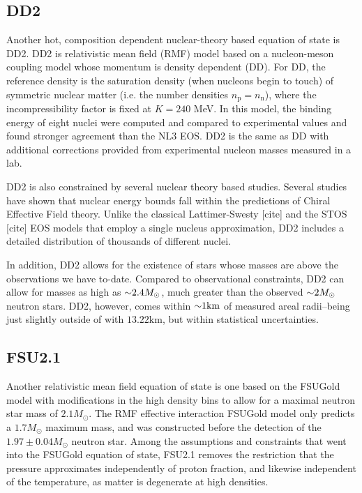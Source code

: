 \subsection{DD2}
\label{sec:dd2}

Another hot, composition dependent nuclear-theory based equation of state is DD2.  DD2 is relativistic mean field (RMF) model based on a nucleon-meson coupling model whose momentum is density dependent (DD).  
For DD, the reference density is the saturation density (when nucleons begin to touch) of symmetric nuclear matter (i.e. the number densities $n_\textrm{p} = n_\textrm{n}$), where the incompressibility factor is fixed at $K = 240$ MeV.
In this model, the binding energy of eight nuclei were computed and compared to experimental values and found stronger agreement than the NL3 EOS.
DD2 is the same as DD with additional corrections provided from experimental nucleon masses measured in a lab.

DD2 is also constrained by several nuclear theory based studies.
Several studies have shown that nuclear energy bounds fall within the predictions of Chiral Effective Field theory.
Unlike the classical Lattimer-Swesty [cite] and the STOS [cite] EOS models that employ a single nucleus approximation, DD2 includes a detailed distribution of thousands of different nuclei.

In addition, DD2 allows for the existence of stars whose masses are above the observations we have to-date.
Compared to observational constraints, DD2 can allow for masses as high as $\mathord{\sim} 2.4 M_\odot$, much greater than the observed $\mathord{\sim} 2 M_\odot$ neutron stars.
DD2, however, comes within $\mathord{\sim} 1 \textrm{km}$ of measured areal radii--being just slightly outside of with $13.22 \textrm{km}$, but within statistical uncertainties.

\subsection{FSU2.1}
\label{sec:fsu21}

Another relativistic mean field equation of state is one based on the FSUGold model with modifications in the high density bins to allow for a maximal neutron star mass of $2.1 M_\odot$.  The RMF effective interaction FSUGold model only predicts a $1.7 M_\odot$ maximum mass, and was constructed before the detection of the $1.97 \pm 0.04 M_\odot$ neutron star.
Among the assumptions and constraints that went into the FSUGold equation of state, FSU2.1 removes the restriction that the pressure approximates independently of proton fraction, and likewise independent of the temperature, as matter is degenerate at high densities.

